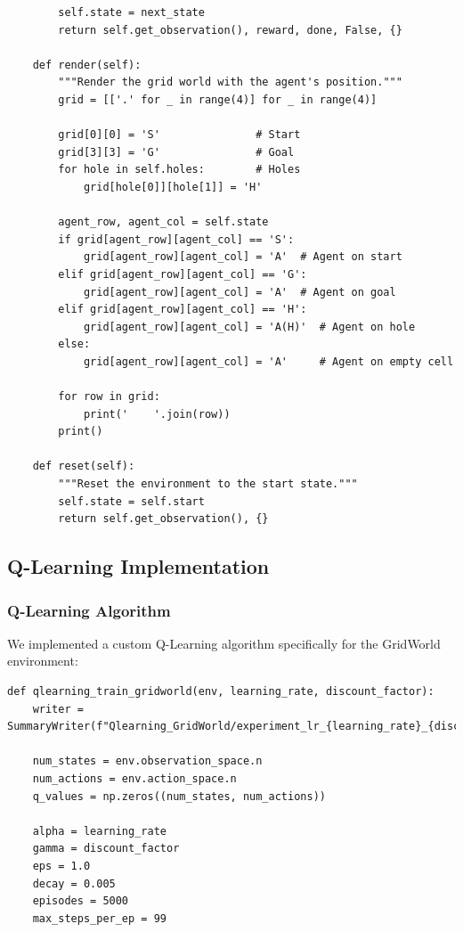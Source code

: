 \documentclass[12pt]{article}
\begin{document}
{{{\begin{verbatim}
        self.state = next_state
        return self.get_observation(), reward, done, False, {}

    def render(self):
        """Render the grid world with the agent's position."""
        grid = [['.' for _ in range(4)] for _ in range(4)]
        
        grid[0][0] = 'S'               # Start
        grid[3][3] = 'G'               # Goal
        for hole in self.holes:        # Holes
            grid[hole[0]][hole[1]] = 'H'
        
        agent_row, agent_col = self.state
        if grid[agent_row][agent_col] == 'S':
            grid[agent_row][agent_col] = 'A'  # Agent on start
        elif grid[agent_row][agent_col] == 'G':
            grid[agent_row][agent_col] = 'A'  # Agent on goal
        elif grid[agent_row][agent_col] == 'H':
            grid[agent_row][agent_col] = 'A(H)'  # Agent on hole
        else:
            grid[agent_row][agent_col] = 'A'     # Agent on empty cell
        
        for row in grid:
            print('    '.join(row))
        print()

    def reset(self):
        """Reset the environment to the start state."""
        self.state = self.start
        return self.get_observation(), {}
\end{verbatim}

\subsection{Q-Learning Implementation}

\subsubsection{Q-Learning Algorithm}

We implemented a custom Q-Learning algorithm specifically for the GridWorld environment:

\begin{verbatim}
def qlearning_train_gridworld(env, learning_rate, discount_factor):
    writer = SummaryWriter(f"Qlearning_GridWorld/experiment_lr_{learning_rate}_{discount_factor}")
    
    num_states = env.observation_space.n
    num_actions = env.action_space.n
    q_values = np.zeros((num_states, num_actions))
    
    alpha = learning_rate
    gamma = discount_factor
    eps = 1.0
    decay = 0.005
    episodes = 5000
    max_steps_per_ep = 99
    

\end{verbatim}}}}
\end{document}
